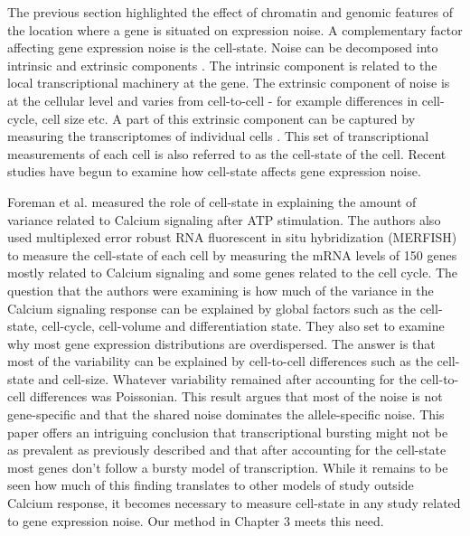 The previous section highlighted the effect of chromatin and genomic features of the location where a gene is situated on expression noise. A complementary factor affecting gene expression noise is the cell-state. Noise can be decomposed into intrinsic and extrinsic components \cite{elowitz} \cite{oshea}. The intrinsic component is related to the local transcriptional machinery at the gene. The extrinsic component of noise is at the cellular level and varies from cell-to-cell - for example differences in cell-cycle, cell size etc. A part of this extrinsic component can be captured by measuring the transcriptomes of individual cells \cite{dropseq}. This set of transcriptional measurements of each cell is also referred to as the cell-state of the cell. Recent studies have begun to examine how cell-state affects gene expression noise.

Foreman et al. \cite{Foreman} measured the role of cell-state in explaining the amount of variance related to Calcium signaling after ATP stimulation. The authors also used multiplexed error robust RNA fluorescent in situ hybridization (MERFISH) to measure the cell-state of each cell by measuring the mRNA levels of 150 genes mostly related to Calcium signaling and some genes related to the cell cycle. The question that the authors were examining is how much of the variance in the Calcium signaling response can be explained by global factors such as the cell-state, cell-cycle, cell-volume and differentiation state. They also set to examine why most gene expression distributions are overdispersed. The answer is that most of the variability can be explained by cell-to-cell differences such as the cell-state and cell-size. Whatever variability remained after accounting for the cell-to-cell differences was Poissonian. This result argues that most of the noise is not gene-specific and that the shared noise dominates the allele-specific noise. This paper offers an intriguing conclusion that transcriptional bursting might not be as prevalent as previously described and that after accounting for the cell-state most genes don't follow a bursty model of transcription. While it remains to be seen how much of this finding translates to other models of study outside Calcium response, it becomes necessary to measure cell-state in any study related to gene expression noise. Our method in Chapter 3 meets this need.


